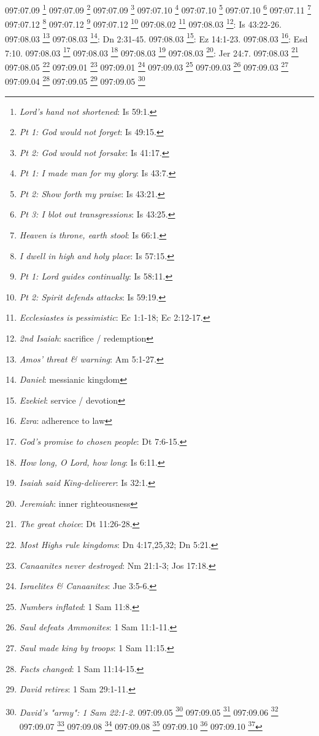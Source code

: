 {{{{{{{{{{{{{097:07.09 \footnote{\textit{Lord's hand not shortened}: Is 59:1.}
097:07.09 \footnote{\textit{Pt 1: God would not forget}: Is 49:15.}
097:07.09 \footnote{\textit{Pt 2: God would not forsake}: Is 41:17.}
097:07.10 \footnote{\textit{Pt 1: I made man for my glory}: Is 43:7.}
097:07.10 \footnote{\textit{Pt 2: Show forth my praise}: Is 43:21.}
097:07.10 \footnote{\textit{Pt 3: I blot out transgressions}: Is 43:25.}
097:07.11 \footnote{\textit{Heaven is throne, earth stool}: Is 66:1.}
097:07.12 \footnote{\textit{I dwell in high and holy place}: Is 57:15.}
097:07.12 \footnote{\textit{Pt 1: Lord guides continually}: Is 58:11.}
097:07.12 \footnote{\textit{Pt 2: Spirit defends attacks}: Is 59:19.}
097:08.02 \footnote{\textit{Ecclesiastes is pessimistic}: Ec 1:1-18; Ec 2:12-17.}
097:08.03 \footnote{\textit{2nd Isaiah}: sacrifice / redemption}: Is 43:22-26.}
097:08.03 \footnote{\textit{Amos' threat & warning}: Am 5:1-27.}
097:08.03 \footnote{\textit{Daniel}: messianic kingdom}: Dn 2:31-45.}
097:08.03 \footnote{\textit{Ezekiel}: service / devotion}: Ez 14:1-23.}
097:08.03 \footnote{\textit{Ezra}: adherence to law}: Esd 7:10.}
097:08.03 \footnote{\textit{God's promise to chosen people}: Dt 7:6-15.}
097:08.03 \footnote{\textit{How long, O Lord, how long}: Is 6:11.}
097:08.03 \footnote{\textit{Isaiah said King-deliverer}: Is 32:1.}
097:08.03 \footnote{\textit{Jeremiah}: inner righteousness}: Jer 24:7.}
097:08.03 \footnote{\textit{The great choice}: Dt 11:26-28.}
097:08.05 \footnote{\textit{Most Highs rule kingdoms}: Dn 4:17,25,32; Dn 5:21.}
097:09.01 \footnote{\textit{Canaanites never destroyed}: Nm 21:1-3; Jos 17:18.}
097:09.01 \footnote{\textit{Israelites & Canaanites}: Jue 3:5-6.}
097:09.03 \footnote{\textit{Numbers inflated}: 1 Sam 11:8.}
097:09.03 \footnote{\textit{Saul defeats Ammonites}: 1 Sam 11:1-11.}
097:09.03 \footnote{\textit{Saul made king by troops}: 1 Sam 11:15.}
097:09.04 \footnote{\textit{Facts changed}: 1 Sam 11:14-15.}
097:09.05 \footnote{\textit{David retires}: 1 Sam 29:1-11.}
097:09.05 \footnote{\textit{David's "army": 1 Sam 22:1-2.}
097:09.05 \footnote{\textit{Philistine alliance}: 1 Sam 27:2-3.}
097:09.05 \footnote{\textit{Saul's tragic defeat}: 1 Cr 10:1-9; 1 Sam 31:1-9; 2 Sam 1:6-11.}
097:09.06 \footnote{\textit{Ritual errors}: 1 Sam 28:18.}
097:09.07 \footnote{\textit{David to Hebron}: 2 Sam 2:1-4.}
097:09.08 \footnote{\textit{Crowned King of Judah by army}: 2 Sam 2:4.}
097:09.08 \footnote{\textit{Priest's version of kingship}: 1 Sam 16:1-13.}
097:09.10 \footnote{\textit{Bathsheba}: 2 Sam 11:26-27.}
097:09.10 \footnote{\textit{David marries Milchal}: 1 Sam 18:22-27.}
}}}}}}}}}
